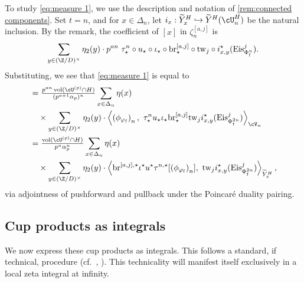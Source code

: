\documentclass[10pt,reqno,a4paper]{amsart}
\newcommand{\subf}{_{\mathrm{f}}}
\begin{document}
To study \eqref{eq:measure 1}, we use the description and notation of \cref{rem:connected components}. Set $t = n$, and for $x \in \Delta_n$, let $i_{x} : \widetilde{Y}^H_{x} \hookrightarrow \widetilde{Y}^H(\cU_{n}^H)$ be the natural inclusion. By the remark, the coefficient of $[x]$ in $ \zeta_n^{[a,j]}$ is
\[
\sum_{y \in (\Z/D)^\times} \eta_2(y) \cdot p^{an} \ \tau_\star^n \circ u_\star \circ \iota_{\star} \circ \mathrm{br}^{[a,j]}_\star \circ \mathrm{tw}_{j} \circ i_{x,y}^\star (\mathrm{Eis}_{\Phi\subf^{n}}^{j}).
\]
Substituting, we see that \eqref{eq:measure 1} is equal to
\begin{align}
&= \tfrac{ p^{an}\operatorname{vol}(\cU^{(p)} \cap H)}{(p^{a+1}\alpha_p)^n}	\sum_{x \in \Delta_n} \eta(x)\\ &\hspace{10pt}\times \sum_{y \in (\Z/D)^\times} \eta_2(y)\cdot \left\langle \left(\phi_{\varphi\subf}\right)_n, \	\tau_\star^n  u_\star \iota_{\star} \mathrm{br}^{[a,j]}_\star  \mathrm{tw}_{j} i_{x,y}^\star(\mathrm{Eis}_{\Phi\subf^{2n}}^{j}) \right\rangle_{\cV_n}\notag\\
&= \tfrac{  \operatorname{vol}(\cU^{(p)} \cap H)}{p^{n}\alpha_p^n}	\sum_{x \in \Delta_n} \eta(x)\label{eq:measure 2}\\
&\hspace{10pt}\times \sum_{y \in (\Z/D)^\times} \eta_2(y) \cdot \left\langle \mathrm{br}^{[a,j],\star}  \iota^{\star}  u^\star \tau^{n,\star}[\left(\phi_{\varphi\subf}\right)_n], \ 	  \mathrm{tw}_{j}  i_{x,y}^\star(\mathrm{Eis}_{\Phi\subf^{2n}}^{j}) \right\rangle_{\widetilde{Y}^H_{x}}, \notag
\end{align}
via adjointness of pushforward and pullback under the Poincar\'e duality pairing.

\subsection{Cup products as integrals}\label{sec:cup product integral}
We now express these cup products as integrals. This follows a standard, if technical, procedure (cf.\ \cite[Lem.\ 1.3]{Mah98}, \cite[Lem.\ 3.2]{Mah00}). This technicality will manifest itself exclusively in a local zeta  integral at infinity.
\end{document}
